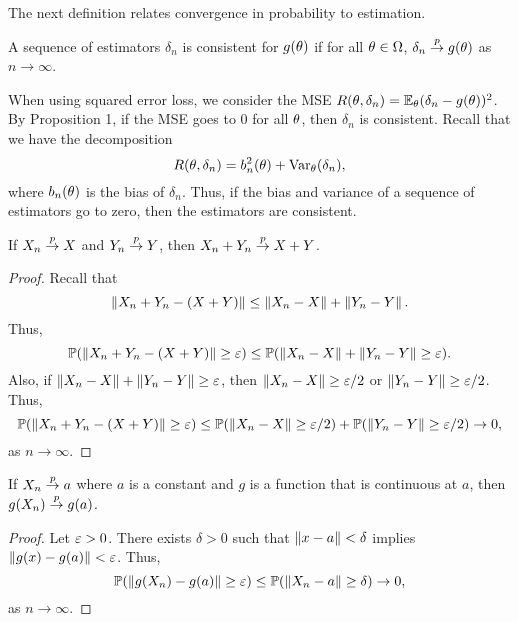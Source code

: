 The next definition relates convergence in probability to estimation.
\begin{definition}
    A sequence of estimators $\delta_n$ is consistent for $g({\theta})$ if for all ${\theta} \in {{\Omega}}$, $\delta_n \stackrel{p}{\to} g({\theta})$ as $n \to \infty$.
\end{definition}
\begin{remark}
    When using squared error loss, we consider the MSE $R({\theta},\delta_n) = {\mathbb{E}}_{\theta}(\delta_n-g({\theta}))^2$. By Proposition 1, if the MSE goes to 0 for all ${\theta}$, then $\delta_n$ is consistent. Recall that we have the decomposition
    \[R({\theta},\delta_n) = b_n^2({\theta}) + \operatorname{Var}_{\theta}(\delta_n),\]
    where $b_n({\theta})$ is the bias of $\delta_n$. Thus, if the bias and variance of a sequence of estimators go to zero, then the estimators are consistent.
\end{remark}
\begin{exercise}
    If $X_n \stackrel{p}{\to} X$ and $Y_n \stackrel{p}{\to} Y$, then $X_n+Y_n \stackrel{p}{\to} X+Y$.
    \begin{proof}
        Recall that
        \[\left\|X_n+Y_n-(X+Y)\right\| \le \left\|X_n-X\right\|+\left\|Y_n-Y\right\|.\]
        Thus,
        \[{\mathbb{P}}(\left\|X_n+Y_n - (X+Y)\right\|\ge\varepsilon) \le {\mathbb{P}}( \left\|X_n-X\right\|+\left\|Y_n-Y\right\| \ge \varepsilon). \]
        Also, if $\left\|X_n-X\right\|+\left\|Y_n-Y\right\| \ge \varepsilon$, then $\left\|X_n -X\right\| \ge \varepsilon/2$ or $\left\|Y_n-Y\right\| \ge \varepsilon/2$. Thus,
        \[{\mathbb{P}}(\left\|X_n+Y_n - (X+Y)\right\|\ge\varepsilon) \le {\mathbb{P}}(\left\|X_n-X\right\| \ge \varepsilon/2 )+{\mathbb{P}}(\left\|Y_n-Y\right\| \ge \varepsilon/2) \to 0, \]
        as $n \to \infty$.
    \end{proof}
\end{exercise}
\begin{exercise}
    If $X_n \stackrel{p}{\to} a$ where $a$ is a constant and $g$ is a function that is continuous at $a$, then $g(X_n) \stackrel{p}{\to} g(a)$.
    \begin{proof}
        Let $\varepsilon > 0$. There exists $\delta > 0$ such that $\left\|x-a\right\| < \delta$ implies $\left\|g(x)-g(a)\right\| < \varepsilon$. Thus,
        \[{\mathbb{P}}(\left\|g(X_n)-g(a)\right\| \ge \varepsilon) \le {\mathbb{P}}(\left\|X_n-a\right\| \ge \delta) \to 0, \]
        as $n \to \infty$. 
    \end{proof}
\end{exercise}
